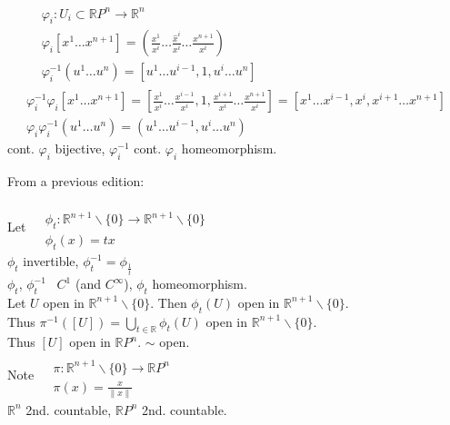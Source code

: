 \[
\begin{gathered}
  \begin{aligned}
    & \varphi_i : U_i \subset \mathbb{R}P^n \to \mathbb{R}^n \\ 
    & \varphi_i[x^1 \dots x^{n+1} ] = \left( \frac{x^1}{x^i} \dots \frac{ \widehat{x}^i }{ x^i } \dots \frac{x^{n+1}}{ x^i } \right) \\
    & \varphi^{-1}_i(u^1 \dots u^n) = [ u^1 \dots u^{i-1}, 1 , u^i \dots u^n ]
\end{aligned} \\ 
  \varphi_i^{-1} \varphi_i[x^1 \dots x^{n+1} ] = \left[ \frac{x^1 }{ x^i } \dots \frac{x^{i-1}}{ x^i } , 1 , \frac{x^{i+1}}{ x^i} \dots \frac{x^{n+1}}{ x^i } \right] = [x^1 \dots x^{i-1}, x^i , x^{i+1} \dots x^{n+1} ] \\
  \varphi_i \varphi^{-1}_i(u^1 \dots u^n) = (u^1 \dots u^{i-1} , u^i  \dots u^n )
\end{gathered}
\]
cont. $\varphi_i$ bijective, $\varphi_i^{-1}$ cont. $\varphi_i$ homeomorphism.  

From a previous edition: 



Let $ \begin{aligned} & \quad \\ 
  & \phi_t : \mathbb{R}^{n+1}\backslash \lbrace  0 \rbrace \to \mathbb{R}^{n+1} \backslash \lbrace 0 \rbrace \\ 
  & \phi_t(x) = tx \end{aligned}$ \\
$\phi_t$ invertible, $\phi_t^{-1} = \phi_{\frac{1}{t}}$ \\
$\phi_t$, $\phi_t^{-1}$ \, $C^1$ (and $C^{\infty}$), $\phi_t$ homeomorphism.  \\

Let $U$ open in $\mathbb{R}^{n+1}\backslash \lbrace 0 \rbrace$.  Then $\phi_t(U)$ open in $\mathbb{R}^{n+1}\backslash \lbrace 0 \rbrace$.  \\
Thus $\pi^{-1}([U]) = \bigcup_{t \in \mathbb{R}} \phi_t(U)$ open in $\mathbb{R}^{n+1}\backslash \lbrace 0 \rbrace$.  \\
Thus $[U]$ open in $\mathbb{R}P^n$.  $\sim$ open.  \\

Note $\begin{aligned} & \quad  \\
  & \pi : \mathbb{R}^{n+1} \backslash \lbrace 0 \rbrace \to \mathbb{R}P^n \\
  & \pi(x) = \frac{x}{ \| x\| } \end{aligned}$ \\
$\mathbb{R}^n$ 2nd. countable, $\mathbb{R}P^n$ 2nd. countable.  


